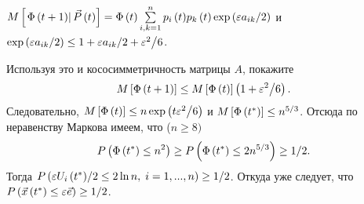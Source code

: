 \begin{problem}
$M\left[ {\left. {\Phi \left( {t+1} \right)} \right|\vec {P}\left( t \right)} 
\right]=\Phi \left( t \right)\sum\limits_{i,k=1}^n {p_i \left( t \right)} 
p_k \left( t \right)\exp \left( {{\varepsilon a_{ik} } \mathord{\left/ 
{\vphantom {{\varepsilon a_{ik} } 2}} \right. \kern-\nulldelimiterspace} 2} 
\right)$ и $\exp \left( {{\varepsilon a_{ik} } \mathord{\left/ {\vphantom 
{{\varepsilon a_{ik} } 2}} \right. \kern-\nulldelimiterspace} 2} \right)\le 
1+{\varepsilon a_{ik} } \mathord{\left/ {\vphantom {{\varepsilon a_{ik} } 
2}} \right. \kern-\nulldelimiterspace} 2+{\varepsilon ^2} \mathord{\left/ 
{\vphantom {{\varepsilon ^2} 6}} \right. \kern-\nulldelimiterspace} 6$.

Используя это и кососимметричность матрицы $A$, покажите
\[
M\left[ {\Phi \left( {t+1} \right)} \right]\le M\left[ {\Phi \left( t 
\right)} \right]\left( {1+{\varepsilon ^2} \mathord{\left/ {\vphantom 
{{\varepsilon ^2} 6}} \right. \kern-\nulldelimiterspace} 6} \right).
\]
Следовательно, $M\left[ {\Phi \left( t \right)} \right]\le n\exp \left( 
{{t\varepsilon ^2} \mathord{\left/ {\vphantom {{t\varepsilon ^2} 6}} \right. 
\kern-\nulldelimiterspace} 6} \right)$ и $M\left[ {\Phi \left( {t^\ast } 
\right)} \right]\le n^{5 \mathord{\left/ {\vphantom {5 3}} \right. 
\kern-\nulldelimiterspace} 3}$. Отсюда по неравенству Маркова имеем, что 
($n\ge 8)$
\[
P\left( {\Phi \left( {t^\ast } \right)\le n^2} \right)\ge P\left( {\Phi 
\left( {t^\ast } \right)\le 2n^{5 \mathord{\left/ {\vphantom {5 3}} \right. 
\kern-\nulldelimiterspace} 3}} \right)\ge 1 \mathord{\left/ {\vphantom {1 
2}} \right. \kern-\nulldelimiterspace} 2.
\]
Тогда $P\left( {{\varepsilon U_i \left( {t^\ast } \right)} \mathord{\left/ 
{\vphantom {{\varepsilon U_i \left( {t^\ast } \right)} 2}} \right. 
\kern-\nulldelimiterspace} 2\le 2\ln n,\;i=1,...,n} \right)\ge 1 
\mathord{\left/ {\vphantom {1 2}} \right. \kern-\nulldelimiterspace} 2$. 
Откуда уже следует, что $P\left( {\vec {x}\left( {t^\ast } \right)\le 
\varepsilon \vec {e}} \right)\ge 1 \mathord{\left/ {\vphantom {1 2}} \right. 
\kern-\nulldelimiterspace} 2$.
\end{problem}


